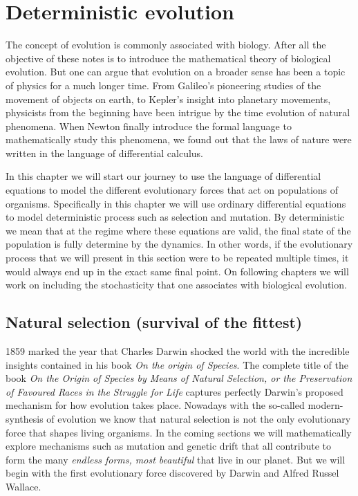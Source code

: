 \section{Deterministic evolution}
The concept of evolution is commonly associated with biology. After all the
objective of these notes is to introduce the mathematical theory of biological
evolution. But one can argue that evolution on a broader sense has been a topic
of physics for a much longer time. From Galileo's pioneering studies of the
movement of objects on earth, to Kepler's insight into planetary movements,
physicists from the beginning have been intrigue by the time evolution of
natural phenomena. When Newton finally introduce the formal language to
mathematically study this phenomena, we found out that the laws of nature were
written in the language of differential calculus.

In this chapter we will start our journey to use the language of differential
equations to model the different evolutionary forces that act on populations of
organisms. Specifically in this chapter we will use ordinary differential
equations to model deterministic process such as selection and mutation. By
deterministic we mean that at the regime where these equations are
valid, the final state of the population is fully determine by the dynamics. In
other words, if the evolutionary process that we will present in this section
were to be repeated multiple times, it would always end up in the exact same
final point. On following chapters we will work on including the stochasticity
that one associates with biological evolution.

\subsection{Natural selection (survival of the fittest)}
\label{sec_selection}
1859 marked the year that Charles Darwin shocked the world with the incredible
insights contained in his book \textit{On the origin of Species}. The complete 
title of the book \textit{On the Origin of Species by Means of Natural
Selection, or the Preservation of Favoured Races in the Struggle for Life}
captures perfectly Darwin's proposed mechanism for how evolution takes place.
Nowadays with the so-called modern-synthesis of evolution we know that natural
selection is not the only evolutionary force that shapes living organisms. In
the coming sections we will mathematically explore mechanisms such as mutation
and genetic drift that all contribute to form the many \textit{endless forms,
most beautiful} that live in our planet. But we will begin with the first
evolutionary force discovered by Darwin and Alfred Russel Wallace.

